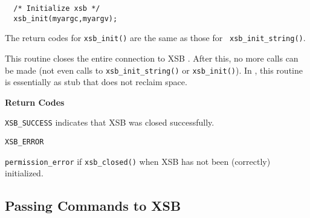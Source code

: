 \begin{description}
\begin{itemize}
\begin{verbatim}
  /* Initialize xsb */
  xsb_init(myargc,myargv);
    \end{verbatim}
\end{itemize}
The return codes for {\tt xsb\_init()} are the same as those for {\tt
  xsb\_init\_string()}.

 
%
This routine closes the entire connection to XSB .  After this, no
more calls can be made (not even calls to {\tt xsb\_init\_string()} or
{\tt xsb\_init()}).  In \version{}, this routine is essentially as
stub that does not reclaim space. 

{\bf Return Codes} 
\bi
\item {\tt XSB\_SUCCESS} indicates that XSB was closed successfully.
%
\item {\tt XSB\_ERROR} 
\bi
\item {\tt permission\_error} if {\tt xsb\_closed()} when XSB has not been
(correctly) initialized.  
\ei
%
\ei

\end{description}

\subsection{Passing Commands to XSB}

